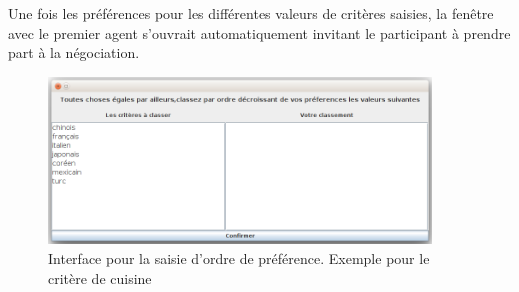 	Une fois les préférences pour les différentes valeurs de critères saisies, la fenêtre avec le premier agent s'ouvrait automatiquement invitant le participant à prendre part à la négociation. 
	
	\begin{figure}[b]
		\includegraphics[width=4in]{Figures/pref.png}
		\caption{\label{fig:pref} Interface pour la saisie d'ordre de préférence. Exemple pour le critère de cuisine}
	\end{figure} 
	
	
